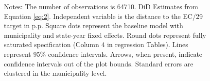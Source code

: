 \begin{figure}[h!]
\begin{center}
    \end{center}
        \scriptsize{Notes: The number of observations is 64710. DiD Estimates from Equation \ref{eq:2}. Independent variable is the distance to the EC/29 target in p.p. Square dots represent the baseline model with municipality and state-year fixed effects. Round dots represent fully saturated specification (Column 4 in regression Tables). Lines represent 95\% confidence intervals. Arrows, when present, indicate confidence intervals out of the plot bounds. Standard errors are clustered in the municipality level.}
    
\end{figure}